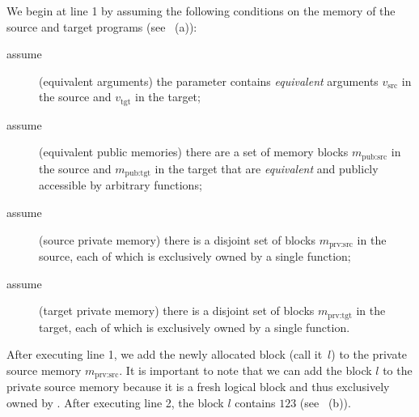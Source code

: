 We begin at line 1 by assuming the
following conditions on the memory of the source and target programs (see ~(a)):
\begin{description}
\item[assume] (equivalent arguments) the parameter  contains
  \emph{equivalent} arguments $v_\textrm{src} $ in the source and $v_\textrm{tgt}$ in the target;
\item[assume] (equivalent public memories) 
  there are a set of memory blocks
  $m_\textrm{pub:src}$ in the source and
  $m_\textrm{pub:tgt}$ in the target that are
  \emph{equivalent} and publicly accessible by arbitrary functions;
\item[assume] (source private memory) 
  there is a disjoint set of blocks
  $m_\textrm{prv:src}$ in the source, each of which is
  exclusively owned by a single function;
\item[assume] (target private memory) 
  there is a disjoint set of blocks
  $m_\textrm{prv:tgt}$ in the target, each of which is
  exclusively owned by a single function.
\end{description}
After executing line 1, we add the newly allocated block (call it~$l$) to
the private source memory $m_\textrm{prv:src}$. It is important to note that we can add the
block $l$ to the private source memory because it is a fresh logical
block and thus exclusively owned by .  After executing
line 2, the block $l$ contains $123$ (see ~(b)).

